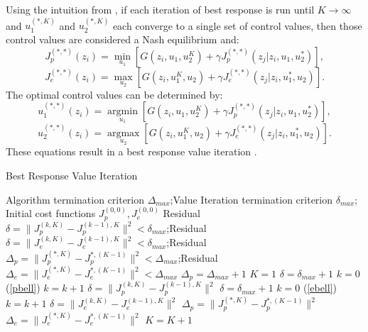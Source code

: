 Using the intuition from , if each iteration of best response is run until $K \rightarrow \infty$ and $u_1^{(*,K)}$ and $u_2^{(*,K)}$ each converge to a single set of control values, then those control values are considered a Nash equilibrium and:
\begin{equation}\label{pbropt}
J_p^{(*,*)}(z_i)= \underset{u_1 }{\operatorname{min }}[G(z_i,u_1,u_2^K)+\gamma J_p^{(*,*)}(z_j|z_i,u_1,u_2^*)],
\end{equation}
\begin{equation}\label{ebropt}
J_e^{(*,*)}(z_i)= \underset{u_2 }{\operatorname{max }}[G(z_i,u_1^K,u_2)+\gamma J_e^{(*,*)}(z_j|z_i,u_1^*,u_2)].
\end{equation}
The optimal control values can be determined by:
\begin{equation}\label{pbrcont}
u_1^{(*,*)}(z_i)= \underset{u_1 }{\operatorname{arg min }}[G(z_i,u_1,u_2^K)+\gamma J_p^{(*,*)}(z_j|z_i,u_1,u_2^*)],
\end{equation}
\begin{equation}\label{ebrcont}
u_2^{(*,*)}(z_i)= \underset{u_2 }{\operatorname{arg max }}[G(z_i,u_1^K,u_2)+\gamma J_e^{(*,*)}(z_j|z_i,u_1^*,u_2)].
\end{equation}
These equations result in a best response value iteration .    
\begin{algorithm}
\caption{Best Response Value Iteration }\label{DPBRalg}
\begin{algorithmic}[1]
	\Require Algorithm termination criterion $\Delta_{max}$;Value Iteration termination criterion $\delta_{max}$; Initial cost functions $J_p^{(0,0)},J_e^{(0,0)}$
	\Ensure Residual $\delta=\|J_p^{(k,K)}-J_p^{(k-1),K}\|^2<\delta_{max}$;Residual $\delta=\|J_e^{(k,K)}-J_e^{(k-1),K}\|^2<\delta_{max}$;Residual $\Delta_p=\|J_p^{(*,K)}-J_p^{*,(K-1)}\|^2<\Delta_{max}$;Residual $\Delta_e=\|J_e^{(*,K)}-J_e^{*,(K-1)}\|^2<\Delta_{max}$
	\State $\Delta_p = \Delta_{max} + 1$
	\State $K = 1$
	 \do{}
		\State $\delta = \delta_{max} + 1$
		\State $k = 0$
		 \do{}
				\State (\ref{pbell})
			\EndFor
			\State $k = k+1$
			\State $\delta = \|J_p^{(k,K)}-J_p^{(k-1),K}\|^2$
		\EndWhile
		\State $\delta = \delta_{max} + 1$
		\State $k = 0$
		 \do{}
				\State (\ref{ebell})
			\EndFor
			\State $k = k+1$
			\State $\delta = \|J_e^{(k,K)}-J_e^{(k-1),K}\|^2$
		\EndWhile
		\State $\Delta_p = \|J_p^{(*,K)}-J_p^{*,(K-1)}\|^2$
		\State $\Delta_e = \|J_e^{(*,K)}-J_e^{*,(K-1)}\|^2$
		\State $K = K+1$
	\EndWhile
\end{algorithmic}
\end{algorithm}

